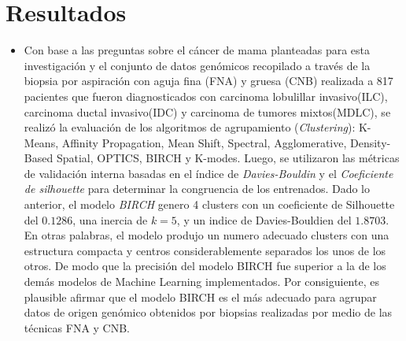 \section{Resultados}
\begin{itemize}[label=\HandPencilLeft]
	\item Con base a las preguntas sobre el cáncer de mama planteadas para esta investigación y el conjunto de datos genómicos recopilado a través de la biopsia por aspiración con aguja fina (FNA) y gruesa (CNB) realizada a 817 pacientes que fueron diagnosticados con carcinoma lobulillar invasivo(ILC), carcinoma ductal invasivo(IDC) y carcinoma de tumores mixtos(MDLC), se realizó la evaluación de  los algoritmos de agrupamiento (\textit{Clustering}): K-Means, Affinity Propagation, Mean Shift, Spectral, Agglomerative, Density-Based Spatial, OPTICS, BIRCH y K-modes. Luego, se utilizaron las métricas de validación interna basadas en el índice de \textit{Davies-Bouldin} y el \textit{Coeficiente de silhouette} para determinar la congruencia de los  entrenados. Dado lo anterior, el modelo \textit{BIRCH} genero 4 clusters con un coeficiente de Silhouette del $0.1286$, una inercia de $k = 5 $, y un indice de Davies-Bouldien del $1.8703$. En otras palabras, el modelo produjo un numero adecuado clusters con una estructura compacta y centros considerablemente separados los unos de los otros. De modo que la precisión del modelo BIRCH fue superior a la de los demás modelos de Machine Learning implementados. Por consiguiente, es plausible afirmar que el modelo BIRCH es el más adecuado para agrupar datos de origen genómico obtenidos por biopsias realizadas por medio de las técnicas FNA y CNB.
\end{itemize}


